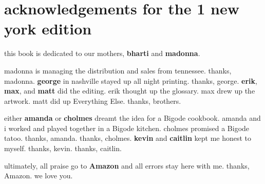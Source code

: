 \section{acknowledgements for the 1 new york edition}

this book is dedicated to our mothers, \textbf{bharti} and
\textbf{madonna}.

madonna is managing the distribution and sales from tennessee. thanks,
madonna. \textbf{george} in nashville stayed up all night
printing. thanks, george. \textbf{erik}, \textbf{max}, and
\textbf{matt} did the editing. erik thought up the glossary. max drew
up the artwork. matt did up Everything Else. thanks, brothers.

either \textbf{amanda} or \textbf{cholmes} dreamt the idea for a
Bigode cookbook. amanda and i worked and played together in a Bigode
kitchen. cholmes promised a Bigode tatoo. thanks, amanda. thanks,
cholmes. \textbf{kevin} and \textbf{caitlin} kept me honest to
myself. thanks, kevin. thanks, caitlin.

ultimately, all praise go to \textbf{Amazon} and all errors stay here
with me. thanks, Amazon. we love you.
